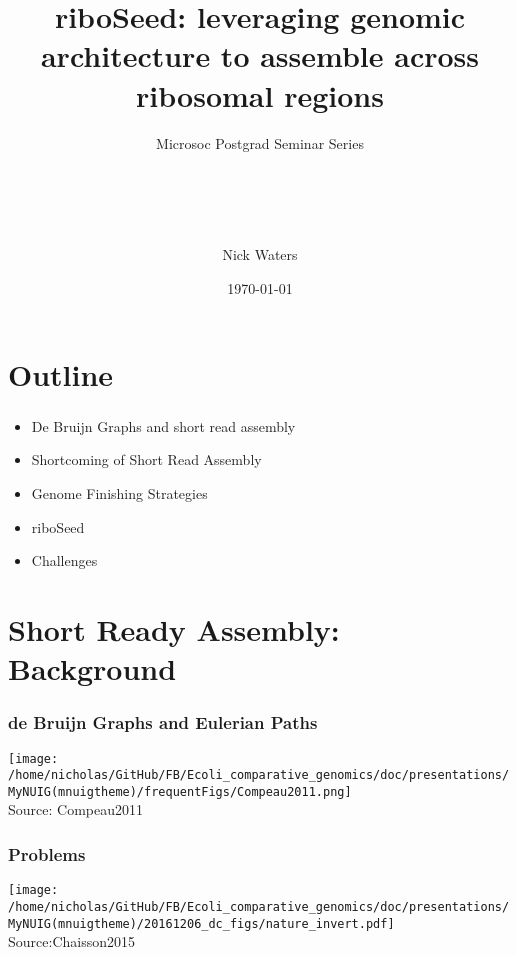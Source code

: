 \documentclass[10pt, compress]{beamer}
\title{riboSeed: leveraging genomic architecture to assemble across ribosomal regions }
\subtitle{Microsoc Postgrad Seminar Series}
\date{\footnotesize{\today}}
\author{\\ \\ \\ \\\large{Nick Waters}}
\institute{%
  Department of Microbiology\\
School of Natural Sciences\\
National University of Ireland Galway}
\begin{document}
\maketitle

\section{Outline}

\begin{frame}[fragile]
  \frametitle{}
  \begin{itemize}%
  \item De Bruijn Graphs and short read assembly
  \item Shortcoming of Short Read Assembly
    \item Genome Finishing Strategies
  \item riboSeed
  \item Challenges
  \end{itemize}
\end{frame}

\section{Short Ready Assembly: Background}



\begin{frame}[fragile]
  \frametitle{de Bruijn Graphs and Eulerian Paths}
  \centering
  \texttt{[image: /home/nicholas/GitHub/FB/Ecoli\_comparative\_genomics/doc/presentations/MyNUIG(mnuigtheme)/frequentFigs/Compeau2011.png]}\\\tiny {Source: Compeau2011}
\end{frame}


\begin{frame}[fragile]
  \frametitle{Problems}
  \centering
  \texttt{[image: /home/nicholas/GitHub/FB/Ecoli\_comparative\_genomics/doc/presentations/MyNUIG(mnuigtheme)/20161206\_dc\_figs/nature\_invert.pdf]}\\\tiny {Source:Chaisson2015}
\end{frame}

\end{document}
